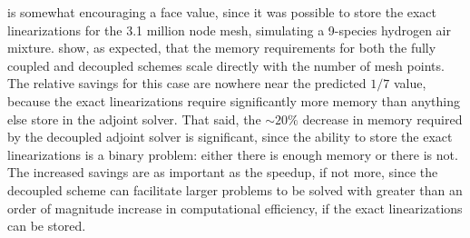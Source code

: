  is somewhat encouraging a face value, since it was
possible to store the exact linearizations for the 3.1 million node mesh,
simulating a 9-species hydrogen air mixture.   show, as
expected, that the memory requirements for both the fully coupled and decoupled
schemes scale directly with the number of mesh points.  The relative savings for
this case are nowhere near the predicted $1/7$ value, because the exact
linearizations require significantly more memory than anything else store in the
adjoint solver.  That said, the $\sim 20\%$ decrease in memory required by the
decoupled adjoint solver is significant, since the ability to store the exact
linearizations is a binary problem: either there is enough memory or there is
not.  The increased savings are as important as the speedup, if not more, since
the decoupled scheme can facilitate larger problems to be solved with greater
than an order of magnitude increase in computational efficiency, if the exact
linearizations can be stored.
